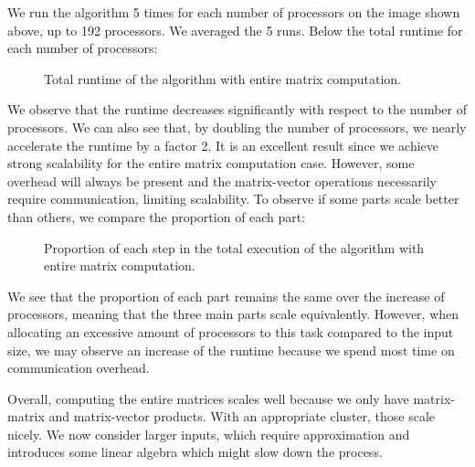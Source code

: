 We run the algorithm 5 times for each number of processors on the image shown above, up to 192 processors.
We averaged the 5 runs.
Below the total runtime for each number of processors:
\begin{figure}[H]
  \centering
  
  \caption{Total runtime of the algorithm with entire matrix computation.}
\end{figure}

We observe that the runtime decreases significantly with respect to the number of processors.
We can also see that, by doubling the number of processors, we nearly accelerate the runtime by a factor 2.
It is an excellent result since we achieve strong scalability for the entire matrix computation case.
However, some overhead will always be present and the matrix-vector operations necessarily require communication, limiting scalability.
To observe if some parts scale better than others, we compare the proportion of each part:
\begin{figure}[H]
  \centering
  
  \caption{Proportion of each step in the total execution of the algorithm with entire matrix computation.}
\end{figure}

We see that the proportion of each part remains the same over the increase of processors, meaning that the three main parts scale equivalently.
However, when allocating an excessive amount of processors to this task compared to the input size, we may observe an increase of the runtime because we spend most time on communication overhead.

Overall, computing the entire matrices scales well because we only have matrix-matrix and matrix-vector products.
With an appropriate cluster, those scale nicely.
We now consider larger inputs, which require approximation and introduces some linear algebra which might slow down the process.
